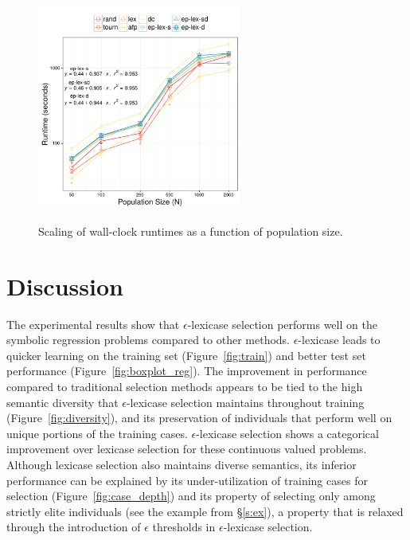 \documentclass[twoside]{article}
\begin{document}
\begin{figure}[htb]
\centering
  \includegraphics[width=0.6\textwidth]{figs/regression_popsize_scaling.pdf}\\
 \caption{Scaling of wall-clock runtimes as a function of population size.}\label{fig:time_pop}


\end{figure}

\section{Discussion}\label{s:discuss}
The experimental results show that $\epsilon$-lexicase selection performs well on the symbolic regression problems compared to other methods. $\epsilon$-lexicase leads to quicker learning on the training set (Figure~\ref{fig:train}) and better test set performance (Figure~\ref{fig:boxplot_reg}). The improvement in performance compared to traditional selection methods appears to be tied to the high semantic diversity that $\epsilon$-lexicase selection maintains throughout training (Figure~\ref{fig:diversity}), and its preservation of individuals that perform well on unique portions of the training cases. $\epsilon$-lexicase selection shows a categorical improvement over lexicase selection for these continuous valued problems. Although lexicase selection also maintains diverse semantics, its inferior performance can be explained by its under-utilization of training cases for selection (Figure~\ref{fig:case_depth}) and its property of selecting only among strictly elite individuals (see the example from \S\ref{s:ex}), a property that is relaxed through the introduction of $\epsilon$ thresholds in $\epsilon$-lexicase selection.   
\end{document}
